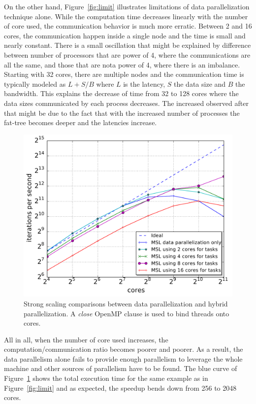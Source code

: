 On the other hand, Figure~\ref{fig:limit} illustrates limitations of data parallelization technique alone.
While the computation time decreases linearly with the number of core used, the communication behavior is much more erratic.
Between 2 and 16 cores, the communication happen inside a single node and the time is small and nearly constant.
There is a small oscillation that might be explained by difference between number of processors that are power of 4, where the communications are all the same, and those that are nota power of 4, where there is an imbalance.
Starting with 32 cores, there are multiple nodes and the communication time is typically modeled as $L+S/B$ where $L$ is the latency, $S$ the data size and $B$ the bandwidth.
This explains the decrease of time from 32 to 128 cores where the data sizes communicated by each process decreases.
The increased observed after that might be due to the fact that with the increased number of processes the fat-tree becomes deeper and the latencies increase.

\begin{figure}[th]\begin{center}
  \includegraphics[width=.6\textwidth]{../results/task_scaling/500_200/base_close_median.pdf}
  \caption{Strong scaling comparisons between data parallelization and hybrid parallelization. A \emph{close} OpenMP clause is used to bind threads onto cores.}
  \label{fig:close}
\end{center}\end{figure}

All in all, when the number of core used increases, the computation/communication ratio becomes poorer and poorer.
As a result, the data parallelism alone fails to provide enough parallelism to leverage the whole machine and other sources of parallelism have to be found.
The blue curve of Figure~\ref{fig:close} shows the total execution time for the same example as in Figure~\ref{fig:limit} and as expected, the speedup bends down from 256 to 2048 cores.

